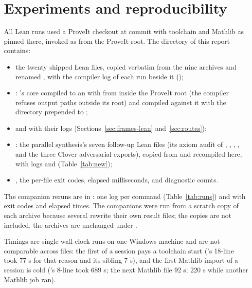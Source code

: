 \section{Experiments and reproducibility}\label{app:repro}
All Lean runs used a ProveIt checkout at commit  with toolchain  and Mathlib as pinned there, invoked as  from the ProveIt root. The  directory of this report contains:
\begin{itemize}
\item the twenty shipped Lean files, copied verbatim from the nine archives and renamed , with the compiler log of each run beside it ();
\item {}: \Cl's core compiled to an  with  from inside the ProveIt root (the compiler refuses output paths outside its root) and  compiled against it with the directory prepended to ;
\item {} and  with their logs (Sections~\ref{sec:frames-lean} and~\ref{sec:routes});
\item {}: the parallel synthesis's seven follow-up Lean files (its axiom audit of , , , , and the three Clover adversarial exports), copied from  and recompiled here, with logs and  (Table~\ref{tab:new});
\item {}, the per-file exit codes, elapsed milliseconds, and diagnostic counts.
\end{itemize}
The companion reruns are in : one log per command (Table~\ref{tab:runs}) and  with exit codes and elapsed times. The companions were run from a scratch copy of each archive because several rewrite their own result files; the copies are not included, the archives are unchanged under .

Timings are single wall-clock runs on one Windows machine and are not comparable across files: the first  of a session pays a toolchain start (\Al's 18-line  took 77 s for that reason and its sibling 7 s), and the first Mathlib import of a session is cold (\He's 8-line  took 689 s; the next Mathlib file 92 s;  220 s while another Mathlib job ran).

